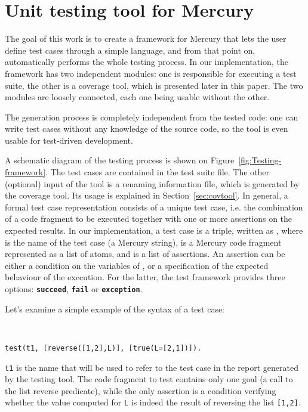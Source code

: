 \documentclass[british]{llncs}
\begin{document}
\section{Unit testing tool for Mercury}\label{unittest}

The goal of this work is to create a
framework for Mercury that lets the user define test cases through
a simple language, and from that point on, automatically performs the whole testing process. In our implementation, the framework has two independent
modules: one is responsible for executing a test suite, the other
is a coverage tool, which is presented later in this paper. The two
modules are loosely connected, each one being usable without the other.

The generation process is completely independent
from the tested code: one can write test cases without any knowledge
of the source code, so the tool is even usable for test-driven development.


A schematic diagram of the testing process is shown on Figure~\ref{fig:Testing-framework}.
The test cases are contained in the test suite file. 
The other (optional) input of the tool is a renaming information file, which is generated
by the coverage tool. Its usage is explained in Section~\ref{sec:covtool}.
In general, a formal test case representation consists of a unique
test case, i.e. the combination of a code fragment to be executed together with one or more assertions
on the expected results.
In our implementation, a test case is a triple, written as ,
where  is the name of the test case (a Mercury string),  is
a Mercury code fragment represented as a list of atoms, and  is a
list of assertions. An assertion can be either a condition on the
variables of , or a specification of the expected behaviour of
the execution. For the latter, the test framework provides three options: \texttt{\textbf{succeed}},
\texttt{\textbf{fail}} or \texttt{\textbf{exception}}. 


Let's examine a simple example of the syntax of a test case:

\begin{example}\label{ex:testcase}\ \\
\vspace*{-0.5 cm}
\begin{lstlisting}[basicstyle={\ttfamily},breaklines=true,tabsize=4]
test(t1, [reverse([1,2],L)], [true(L=[2,1])]).
\end{lstlisting}


\noindent \texttt{t1} is the name that will be used to refer to the
test case in the report generated by the testing tool. The code fragment
to test contains only one goal (a call to the list reverse predicate),
while the only assertion is a condition verifying whether the value
computed for \texttt{L} is indeed the result of reversing the list
\texttt{{[}1,2{]}}. 
\end{example}
\end{document}
